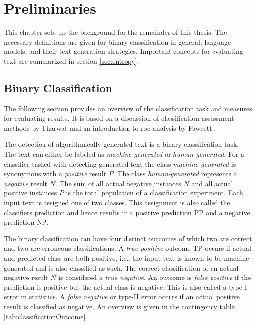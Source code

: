     \chapter{Preliminaries}
    \label{chap:preliminaries}

    This chapter sets up the background for the remainder of this thesis.
    The necessary definitions are given for binary classification in general, language models, and their text generation strategies.
    Important concepts for evaluating text are summarized in section \ref{sec:entropy}.

    \section{Binary Classification}
    The following section provides an overview of the classification task and measures for evaluating results.
    It is based on a discussion of classification assessment methods by Tharwat \cite{tharwat2018classification} and an introduction to \ac{roc} analysis by Fawcett \cite{fawcett2006introduction}.
    
    The detection of algorithmically generated text is a binary classification task.
    The text can either be labeled as \emph{machine-generated} or \emph{human-generated}.
    For a classifier tasked with detecting generated text the class \emph{machine-generated} is synonymous with a \emph{positive} result $P$.
    The class \emph{human-generated} represents a \emph{negative} result $N$.
    The sum of all actual negative instances $N$ and all actual positive instances $P$ is the total population of a classification experiment.
    Each input text is assigned one of two classes. 
    This assignment is also called the classifiers prediction and hence results in a positive prediction $\mathrm{PP}$ and a negative prediction $\mathrm{NP}$.

    The binary classification can have four distinct outcomes of which two are correct and two are erroneous classifications.
    A \emph{true positive} outcome $\mathrm{TP}$ occurs if actual and predicted class are both positive, i.e., the input text is known to be machine-generated and is also classified as such.
    The correct classification of an actual negative result $N$ is considered a \emph{true negative}.
    An outcome is \emph{false positive} if the prediction is positive but the actual class is negative.
    This is also called a type-\RN{1} error in statistics.
    A \emph{false negative} or type-\RN{2} error occurs if an actual positive result is classified as negative.
    An overview is given in the contingency table \ref{tab:classificationOutcome}.

